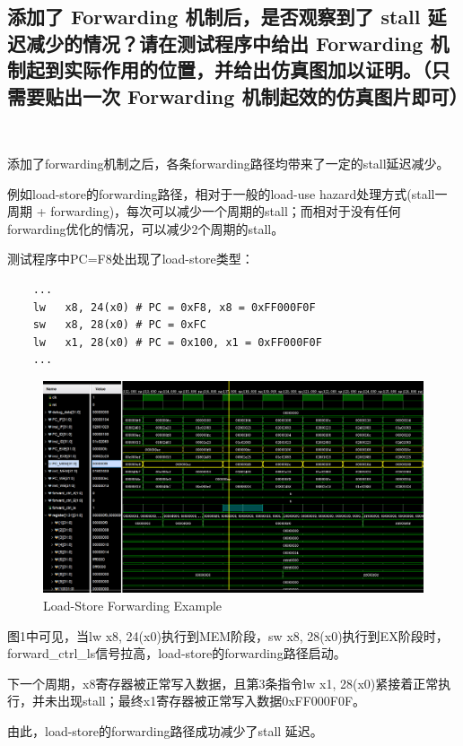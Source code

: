 \documentclass{article}
\begin{document}
\subsection{添加了 Forwarding 机制后，是否观察到了 stall 延迟减少的情况？请在测试程序中给出 Forwarding 机制起到实际作用的位置，并给出仿真图加以证明。（只需要贴出一次 Forwarding 机制起效的仿真图片即可）}

~\par
添加了forwarding机制之后，各条forwarding路径均带来了一定的stall延迟减少。\par

例如load-store的forwarding路径，相对于一般的load-use hazard处理方式(stall一周期 + forwarding)，每次可以减少一个周期的stall；而相对于没有任何forwarding优化的情况，可以减少2个周期的stall。

测试程序中PC=F8处出现了load-store类型：
\begin{verbatim}
    ...
    lw   x8, 24(x0) # PC = 0xF8, x8 = 0xFF000F0F
    sw   x8, 28(x0) # PC = 0xFC
    lw   x1, 28(x0) # PC = 0x100, x1 = 0xFF000F0F
    ...
\end{verbatim}

\begin{figure}[h]
    \centering
    \includegraphics[width=1.2\textwidth]{ls.png}
    \caption{Load-Store Forwarding Example}
    \label{fig:ls}
\end{figure}

图1中可见，当lw x8, 24(x0)执行到MEM阶段，sw x8, 28(x0)执行到EX阶段时，forward\_ctrl\_ls信号拉高，load-store的forwarding路径启动。\par
下一个周期，x8寄存器被正常写入数据，且第3条指令lw x1, 28(x0)紧接着正常执行，并未出现stall；最终x1寄存器被正常写入数据0xFF000F0F。\par
由此，load-store的forwarding路径成功减少了stall 延迟。
\end{document}
